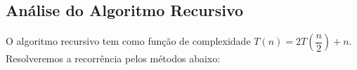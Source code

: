 \subsection{Análise do Algoritmo Recursivo}
O algoritmo recursivo tem como função de complexidade \(T(n) = 2T\left( \dfrac{n}{2} \right) + n \). Resolveremos a recorrência pelos métodos abaixo:




